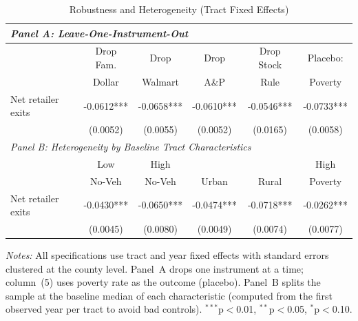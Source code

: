 \begin{table}[t]
\centering
\caption{Robustness and Heterogeneity (Tract Fixed Effects)}
\label{tab:robustness}
\begin{threeparttable}
\begin{tabular}{lccccc}
\toprule
\multicolumn{6}{l}{\textit{Panel A: Leave-One-Instrument-Out}} \\
\midrule
& Drop Fam. & Drop & Drop & Drop Stock & Placebo: \\
& Dollar & Walmart & A\&P & Rule & Poverty \\
\midrule
Net retailer exits & -0.0612*** & -0.0658*** & -0.0610*** & -0.0546*** & -0.0733*** \\
& (0.0052) & (0.0055) & (0.0052) & (0.0165) & (0.0058) \\
\midrule
\multicolumn{6}{l}{\textit{Panel B: Heterogeneity by Baseline Tract Characteristics}} \\
\midrule
& Low & High & & & High \\
& No-Veh & No-Veh & Urban & Rural & Poverty \\
\midrule
Net retailer exits & -0.0430*** & -0.0650*** & -0.0474*** & -0.0718*** & -0.0262*** \\
& (0.0045) & (0.0080) & (0.0049) & (0.0074) & (0.0077) \\
\bottomrule
\end{tabular}
\begin{tablenotes}
\small
\item \textit{Notes:} All specifications use tract and year fixed effects with standard errors clustered at the county level. Panel~A drops one instrument at a time; column~(5) uses poverty rate as the outcome (placebo). Panel~B splits the sample at the baseline median of each characteristic (computed from the first observed year per tract to avoid bad controls). $^{***}$p$<$0.01, $^{**}$p$<$0.05, $^{*}$p$<$0.10.
\end{tablenotes}
\end{threeparttable}
\end{table}
